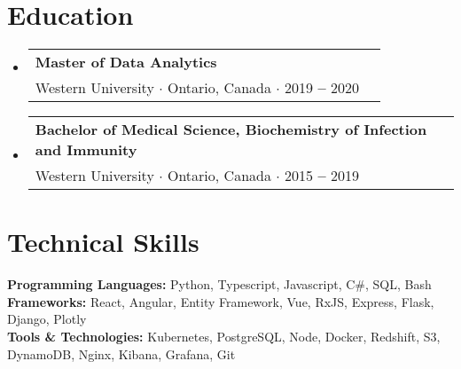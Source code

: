 \documentclass[letterpaper,10pt]{article}
\makeatletter
\newcommand{\resumeEducationHeading}[4]{
  \vspace{-2pt}\item
    \begin{tabular*}{0.97\textwidth}[t]{l@{\extracolsep{\fill}}r}
      \textbf{#1}\\
      \quad \small#3 $\cdot$ \small #4 $\cdot$ #2\\
    \end{tabular*}\vspace{-5pt}
}
\newcommand{\resumeOrganizationHeading}[4]{
  \vspace{-2pt}\item
    \begin{tabular*}{0.97\textwidth}[t]{l@{\extracolsep{\fill}}r}
      \textbf{#1} & \textit{\small #2} \\
      \textit{\small#3}
    \end{tabular*}\vspace{-7pt}
}
\newcommand{\resumeSubHeadingListStart}{\begin{itemize}[leftmargin=0.15in, label={}]}
\newcommand{\resumeSubHeadingListEnd}{\end{itemize}}
\makeatother
\begin{document}

\vspace*{1pt}
\section{Education}
  \vspace{3pt}
  \resumeSubHeadingListStart
    
    \resumeEducationHeading
      {Master of Data Analytics}{2019 \textbf{--} 2020}
      {Western University}{Ontario, Canada}

    \resumeEducationHeading
      {Bachelor of Medical Science, Biochemistry of Infection and Immunity}{2015 \textbf{--} 2019}
      {Western University}{Ontario, Canada}

    \resumeSubHeadingListEnd


\vspace*{1pt}
\section{Technical Skills}
  \vspace{3pt}
  \resumeSubHeadingListStart
    \small{\item{
        \textbf{Programming Languages:}{ Python, Typescript, Javascript, C\#, SQL, Bash } \\ \vspace{3pt}
        \textbf{Frameworks:}{ React, Angular, Entity Framework, Vue, RxJS, Express, Flask, Django, Plotly } \\ \vspace{3pt}
        \textbf{Tools \& Technologies:}{ Kubernetes, PostgreSQL, Node, Docker, Redshift, S3, DynamoDB, Nginx, Kibana, Grafana, Git } \\
    }}
  \resumeSubHeadingListEnd



    
    

\end{document}
